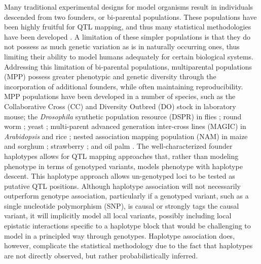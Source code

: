 Many traditional experimental designs for model organisms result in individuals descended from two founders, or bi-parental populations. These populations have been highly fruitful for QTL mapping, and thus many statistical methodologies have been developed \citep{Broman2001}. A limitation of these simpler populations is that they do not possess as much genetic variation as is in naturally occurring ones, thus limiting their ability to model humans adequately for certain biological systems. Addressing this limitation of bi-parental populations, multiparental populations (MPP) possess greater phenotypic and genetic diversity through the incorporation of additional founders, while often maintaining reproducibility. MPP populations have been developed in a number of species, such as the Collaborative Cross (CC) \citep{Hall2012,Srivastava2017} and Diversity Outbred (DO) stock \citep{Churchill2012} in laboratory mouse; the \textit{Drosophila} synthetic population resource (DSPR) in flies \citep{King2012a, Long2014, King2017, Najarro2017, Stanley2017}; round worm \citep{Noble2017}; yeast \citep{Cubillos2017}; multi-parent advanced generation inter-cross lines (MAGIC) in \textit{Arabidopsis} \citep{Kover2009, Huang2011} and rice \citep{Bandillo2013, Raghavan2017}; nested association mapping population (NAM) in maize \citep{Buckler2009} and sorghum \citep{Bouchet2017}; strawberry \citep{Mangandi2017}; and oil palm \citep{Tisne2017}. The well-characterized founder haplotypes allows for QTL mapping approaches that, rather than modeling phenotype in terms of genotyped variants,  models phenotype with haplotype descent. This haplotype approach allows un-genotyped loci to be tested as putative QTL positions. Although haplotype association will not necessarily outperform genotype association, particularly if a genotyped variant, such as a single nucleotide polymorphism (SNP), is causal or strongly tags the causal variant, it will implicitly model all local variants, possibly including local epistatic interactions specific to a haplotype block that would be challenging to model in a principled way through genotypes. Haplotype association does, however, complicate the statistical methodology due to the fact that haplotypes are not directly observed, but rather probabilistically inferred.

